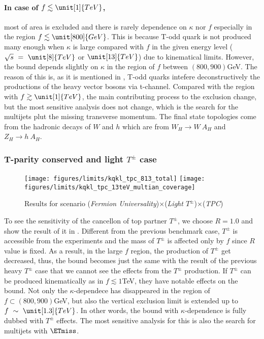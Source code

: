 \paragraph{In case of $f \lesssim \unit[1]{TeV}$,} most of area is excluded and there is rarely dependence on $\kappa$ nor $f$
especially in the region $f \lesssim \unit[800]{GeV}$.
This is because T-odd quark is not produced many enough 
 when $\kappa$ is large compared with $f$ in the given energy level ($\sqrt{s}~=~\unit[8]{TeV}$ or $\unit[13]{TeV}$) due to kinematical limits. 
However, the bound depends slightly on $\kappa$ in the region of $f$ between $(800,900)$GeV. 
The reason of this is, as it is mentioned in , T-odd quarks intefere deconstructively the productions of the heavy vector bosons via t-channel. 
Compared with the region with $f \gtrsim \unit[1]{TeV}$, the main contributing process to the exclusion change,
but the most sensitive analysis does not change, which is the search for the multijets plut the missing transverse momentum. 
The final state topologies come from the hadronic decays of $W$ and $h$ which are from $W_H \to W~A_H$ and $Z_H \to h~A_H$.

\subsubsection{T-parity conserved and light $T^\pm$ case}
\begin{figure*}[h]
\centering
 \texttt{[image: figures/limits/kqkl\_tpc\_813\_total]} 
\texttt{[image: figures/limits/kqkl\_tpc\_13teV\_multian\_coverage]}
\caption{Results for scenario (\emph{Fermion Universality})$\times$(\emph{Light $T^\pm$})$\times$(\emph{TPC})}
\label{fig:cmresults:univtpctop}
\end{figure*}

To see the sensitivity of the cancellon of top partner $T^\pm$, we choose $R=1.0$ and show the result of it in .
Different from the previous benchmark case, $T^\pm$ is accessible from the experiments 
and the mass of $T^\pm$ is affected only by $f$ since $R$ value is fixed.
As a result, in the large $f$ region, the production of $T^\pm$ get decreased, thus, 
the bound becomes just the same with the result of the previous heavy $T^\pm$ case that we cannot see the effects from the $T^\pm$ production. 
If $T^\pm$ can be produced kinematically as in $f \lesssim 1$TeV, they have notable effects on the bound. 
Not only the $\kappa$-dependece has disappeared in the region of $f \subset (800,900)$GeV, 
but also the vertical exclusion limit is extended up to $f ~\sim~\unit[1.3]{TeV}$. 
In other words, the bound with $\kappa$-dependence is fully dubbed with $T^\pm$ effects.
The most sensitive analysis for this is also the search for multijets with $\ETmiss$. 

